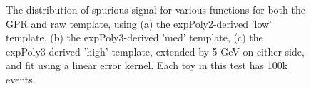 \begin{figure} 
\begin{center}

\caption{The distribution of spurious signal for various functions for both the GPR and raw template, using (a) the expPoly2-derived 'low' template, (b) the expPoly3-derived 'med' template, (c) the expPoly3-derived 'high' template, extended by 5 GeV on either side, and fit using a linear error kernel. Each toy in this test has 100k events.}
\label{fig:linearkernel_lowpt_100k_noSig}
\end{center}
\end{figure}

